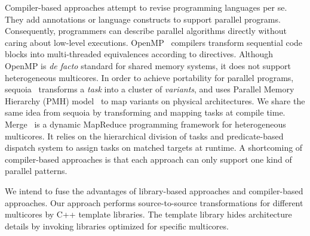 Compiler-based approaches attempt to revise
programming languages per se. They add annotations or language constructs to
support parallel programs. Consequently, programmers
can describe parallel algorithms directly without caring about low-level executions.
OpenMP~\cite{openmp} compilers transform sequential code blocks into
multi-threaded equivalences according to directives. Although OpenMP
is \textit{de facto} standard for shared memory systems, it does not
support heterogeneous multicores. In order to achieve portability for
parallel programs, sequoia~\cite{sequoia, sequoia-compiler} transforms a \textit{task} into a cluster of
\emph{variants}, and uses Parallel Memory Hierarchy (PMH)
model~\cite{pmh} to map variants on physical architectures.
We share the same idea from sequoia by transforming and mapping tasks
at compile time. Merge~\cite{merge} is a dynamic MapReduce programming
framework for heterogeneous multicores. It relies on the hierarchical division of tasks and predicate-based
dispatch system to assign tasks on matched targets at runtime.
A shortcoming of compiler-based approaches is that
each approach can only support one kind of parallel patterns. 

We intend to fuse the advantages of library-based approaches and
compiler-based approaches. Our approach performs source-to-source
transformations for different multicores by C++ template libraries.
The template library hides architecture details by invoking libraries
optimized for specific multicores.






